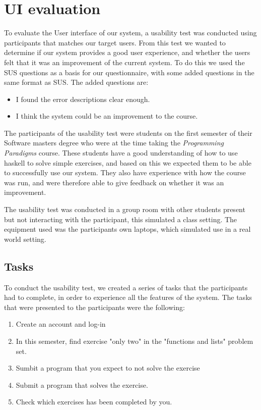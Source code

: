 \section{UI evaluation} \label{UIEval}
To evaluate the User interface of our system, a usability test was conducted using participants that matches our target users. From this test we wanted to determine if our system provides a good user experience, and whether the users felt that it was an improvement of the current system.
To do this we used the SUS questions as a basis for our questionnaire, with some added questions in the same format as SUS. The added questions are:
\begin{itemize}
    \item I found the error descriptions clear enough.
    \item I think the system could be an improvement to the course.
\end{itemize}
The participants of the usability test were students on the first semester of their Software masters degree who were at the time taking the \textit{Programming Paradigms} course. 
These students have a good understanding of how to use haskell to solve simple exercises, and based on this we expected them to be able to successfully use our system. They also have experience with how the course was run, and were therefore able to give feedback on whether it was an improvement.

The usability test was conducted in a group room with other students present but not interacting with the participant, this simulated a class setting. 
The equipment used was the participants own laptops, which simulated use in a real world setting.

\subsection*{Tasks}
To conduct the usability test, we created a series of tasks that the participants had to complete, in order to experience all the features of the system.
The tasks that were presented to the participants were the following:
\begin{enumerate}
    \item Create an account and log-in
    \item In this semester, find exercise "only two" in the "functions and lists" problem set.
    \item Sumbit a program that you expect to not solve the exercise
    \item Submit a program that solves the exercise.
    \item Check which exercises has been completed by you.
\end{enumerate}


